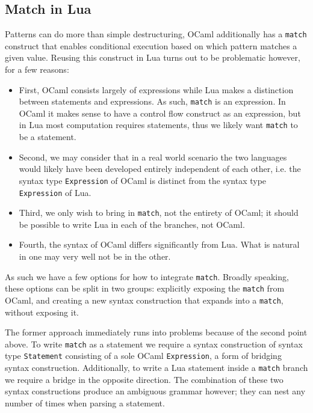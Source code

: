 \documentclass{kththesis}
\begin{document}
\subsection{Match in Lua} \label{sec:match-in-lua}

Patterns can do more than simple destructuring, OCaml additionally has a \texttt{match} construct that enables conditional execution based on which pattern matches a given value. Reusing this construct in Lua turns out to be problematic however, for a few reasons:

\begin{itemize}
\item First, OCaml consists largely of expressions while Lua makes a distinction between statements and expressions. As such, \texttt{match} is an expression. In OCaml it makes sense to have a control flow construct as an expression, but in Lua most computation requires statements, thus we likely want \texttt{match} to be a statement.

\item Second, we may consider that in a real world scenario the two languages would likely have been developed entirely independent of each other, i.e. the syntax type \texttt{Expression} of OCaml is distinct from the syntax type \texttt{Expression} of Lua.

\item Third, we only wish to bring in \texttt{match}, not the entirety of OCaml; it should be possible to write Lua in each of the branches, not OCaml.

\item Fourth, the syntax of OCaml differs significantly from Lua. What is natural in one may very well not be in the other.
\end{itemize}

As such we have a few options for how to integrate \texttt{match}. Broadly speaking, these options can be split in two groups: explicitly exposing the \texttt{match} from OCaml, and creating a new syntax construction that expands into a \texttt{match}, without exposing it.

The former approach immediately runs into problems because of the second point above. To write \texttt{match} as a statement we require a syntax construction of syntax type \texttt{Statement} consisting of a sole OCaml \texttt{Expression}, a form of bridging syntax construction. Additionally, to write a Lua statement inside a \texttt{match} branch we require a bridge in the opposite direction. The combination of these two syntax constructions produce an ambiguous grammar however; they can nest any number of times when parsing a statement.
\end{document}
